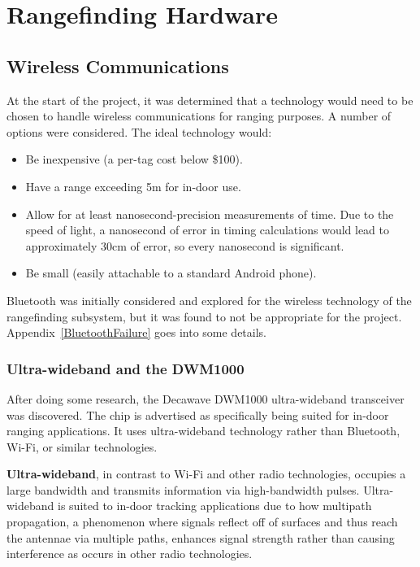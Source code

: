 
\chapter{Rangefinding Hardware} %

\label{RangefindingHardware}

\section{Wireless Communications}
At the start of the project, it was determined that a technology would need to be chosen to handle wireless communications for ranging purposes. A number of options were considered. The ideal technology would:
\begin{itemize}
	\item Be inexpensive (a per-tag cost below \$100).
	\item Have a range exceeding 5m for in-door use.
	\item Allow for at least nanosecond-precision measurements of time. Due to the speed of light, a nanosecond of error in timing calculations would lead to approximately 30cm of error, so every nanosecond is significant.
	\item Be small (easily attachable to a standard Android phone).
\end{itemize}

Bluetooth was initially considered and explored for the wireless technology of the rangefinding subsystem, but it was found to not be appropriate for the project. Appendix~\ref{BluetoothFailure} goes into some details.

\subsection{Ultra-wideband and the DWM1000}
After doing some research, the Decawave DWM1000 ultra-wideband transceiver was discovered. The chip is advertised as specifically being suited for in-door ranging applications. It uses ultra-wideband technology rather than Bluetooth, Wi-Fi, or similar technologies.

\textbf{Ultra-wideband}, in contrast to Wi-Fi and other radio technologies, occupies a large bandwidth and transmits information via high-bandwidth pulses. Ultra-wideband is suited to in-door tracking applications due to how multipath propagation, a phenomenon where signals reflect off of surfaces and thus reach the antennae via multiple paths, enhances signal strength rather than causing interference as occurs in other radio technologies. 

